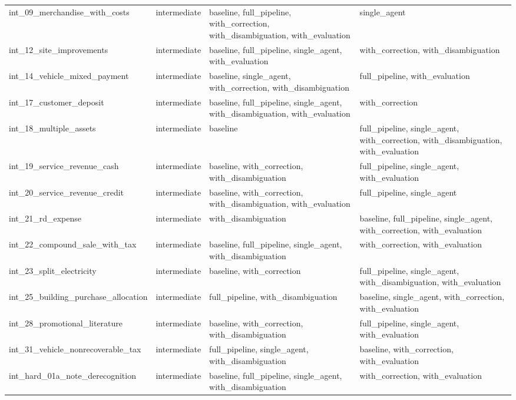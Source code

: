 \begin{table}[htbp]
{\begin{tabular}{l l l l}
  int\_09\_merchandise\_with\_costs & intermediate & baseline, full\_pipeline, with\_correction, with\_disambiguation, with\_evaluation & single\_agent \\
  int\_12\_site\_improvements & intermediate & baseline, full\_pipeline, single\_agent, with\_evaluation & with\_correction, with\_disambiguation \\
  int\_14\_vehicle\_mixed\_payment & intermediate & baseline, single\_agent, with\_correction, with\_disambiguation & full\_pipeline, with\_evaluation \\
  int\_17\_customer\_deposit & intermediate & baseline, full\_pipeline, single\_agent, with\_disambiguation, with\_evaluation & with\_correction \\
  int\_18\_multiple\_assets & intermediate & baseline & full\_pipeline, single\_agent, with\_correction, with\_disambiguation, with\_evaluation \\
  int\_19\_service\_revenue\_cash & intermediate & baseline, with\_correction, with\_disambiguation & full\_pipeline, single\_agent, with\_evaluation \\
  int\_20\_service\_revenue\_credit & intermediate & baseline, with\_correction, with\_disambiguation, with\_evaluation & full\_pipeline, single\_agent \\
  int\_21\_rd\_expense & intermediate & with\_disambiguation & baseline, full\_pipeline, single\_agent, with\_correction, with\_evaluation \\
  int\_22\_compound\_sale\_with\_tax & intermediate & baseline, full\_pipeline, single\_agent, with\_disambiguation & with\_correction, with\_evaluation \\
  int\_23\_split\_electricity & intermediate & baseline, with\_correction & full\_pipeline, single\_agent, with\_disambiguation, with\_evaluation \\
  int\_25\_building\_purchase\_allocation & intermediate & full\_pipeline, with\_disambiguation & baseline, single\_agent, with\_correction, with\_evaluation \\
  int\_28\_promotional\_literature & intermediate & baseline, with\_correction, with\_disambiguation & full\_pipeline, single\_agent, with\_evaluation \\
  int\_31\_vehicle\_nonrecoverable\_tax & intermediate & full\_pipeline, single\_agent, with\_disambiguation & baseline, with\_correction, with\_evaluation \\
  int\_hard\_01a\_note\_derecognition & intermediate & baseline, full\_pipeline, single\_agent, with\_disambiguation & with\_correction, with\_evaluation \\

\end{tabular}}
\end{table}
